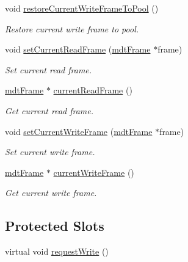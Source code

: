 \begin{DoxyCompactItemize}
void \hyperlink{classmdt_port_thread_helper_a08f1395dda714880d62a24687821eba1}{restore\-Current\-Write\-Frame\-To\-Pool} ()
\begin{DoxyCompactList}\small\item\em Restore current write frame to pool. \end{DoxyCompactList}\item 
void \hyperlink{classmdt_port_thread_helper_aff19dfb54051f097ed73384eae92bf45}{set\-Current\-Read\-Frame} (\hyperlink{classmdt_frame}{mdt\-Frame} $\ast$frame)
\begin{DoxyCompactList}\small\item\em Set current read frame. \end{DoxyCompactList}\item 
\hyperlink{classmdt_frame}{mdt\-Frame} $\ast$ \hyperlink{classmdt_port_thread_helper_a36445798b093f4e7463c353677d816d5}{current\-Read\-Frame} ()
\begin{DoxyCompactList}\small\item\em Get current read frame. \end{DoxyCompactList}\item 
void \hyperlink{classmdt_port_thread_helper_a28aaafda955c9975309ba81c32a61bfa}{set\-Current\-Write\-Frame} (\hyperlink{classmdt_frame}{mdt\-Frame} $\ast$frame)
\begin{DoxyCompactList}\small\item\em Set current write frame. \end{DoxyCompactList}\item 
\hyperlink{classmdt_frame}{mdt\-Frame} $\ast$ \hyperlink{classmdt_port_thread_helper_a7b7f97c9add6cc0344cb674804ac584d}{current\-Write\-Frame} ()
\begin{DoxyCompactList}\small\item\em Get current write frame. \end{DoxyCompactList}\end{DoxyCompactItemize}
\subsection*{Protected Slots}
\begin{DoxyCompactItemize}
\item 
virtual void \hyperlink{classmdt_port_thread_helper_a115ff95797925d444835e33a36f44102}{request\-Write} ()
\end{DoxyCompactItemize}
